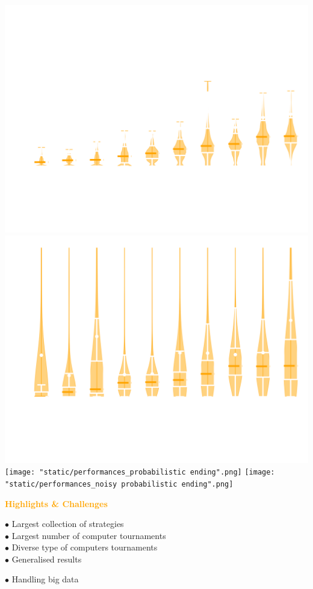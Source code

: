 \documentclass{beamer}
\begin{document}
\begin{frame}
    \begin{center}
        \includegraphics[width=.45\textwidth]{static/performances_standard.png}
        \includegraphics[width=.45\textwidth]{static/performances_noisy.png} \\
        \texttt{[image: "static/performances\_probabilistic ending".png]}
        \texttt{[image: "static/performances\_noisy probabilistic ending".png]}
    \end{center}
\end{frame}

\begin{frame}
    \begin{center}
        \Large{\textbf{\textcolor{orange}{Highlights \& Challenges}}}
    \end{center}
    \vspace{.8cm} \pause

    \begin{minipage}{.5\textwidth}
    \(\bullet\) Largest collection of strategies  \vspace{.1cm} \\ \pause
    \(\bullet\) Largest number of computer tournaments \vspace{.1cm} \\ \pause
    \(\bullet\) Diverse type of computers tournaments  \vspace{.1cm} \\ \pause
    \(\bullet\) Generalised results \pause
    \end{minipage} \hfill
    \begin{minipage}{.45\textwidth}
    \(\bullet\) Handling big data \vspace{.1cm} \\
    \end{minipage}
\end{frame}
\end{document}
